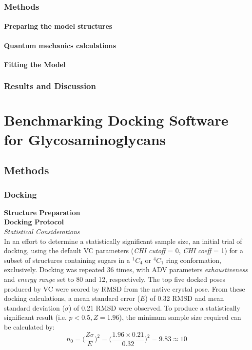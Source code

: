 \documentclass[a4paper, 12pt, openany]{book}
\begin{document}
\subsection{Methods}
\subsubsection*{Preparing the model structures}


\subsubsection*{Quantum mechanics calculations}


\subsubsection*{Fitting the Model}

\subsection{Results and Discussion}


\chapter{Benchmarking Docking Software for Glycosaminoglycans}

\section{Methods}
\subsection{Docking}
\noindent \textbf{Structure Preparation}\\

\noindent \textbf{Docking Protocol}\\
\noindent \textit{Statistical Considerations}\\
In an effort to determine a statistically significant sample size, an initial trial of docking, using the default \ac{VC} parameters (\textit{CHI cutoff} = 0, \textit{CHI coeff} = 1) for a subset of structures containing sugars in a $^{1}C_{4}$ or $^{4}C_{1}$ ring conformation, exclusively. Docking was repeated 36 times, with \ac{ADV} parameters \textit{exhaustiveness} and \textit{energy range} set to 80 and 12, respectively. The top five docked poses produced by \ac{VC} were scored by \ac{RMSD} from the native crystal pose. From these docking calculations, a mean standard error ($E$) of 0.32 \ac{RMSD} and mean standard deviation ($\sigma$) of 0.21 \ac{RMSD} were observed. To produce a statistically significant result (i.e. $p < 0.5, Z = 1.96$), the minimum sample size required can be calculated by:
\begin{equation}  \label{eq:statistical_considerations}
    n_{0} = \Big(\frac{Z \sigma}{E}\Big)^{2} = \Big(\frac{1.96 \times 0.21}{0.32}\Big)^{2} = 9.83 \approx 10
\end{equation}
\\
\\
\end{document}

